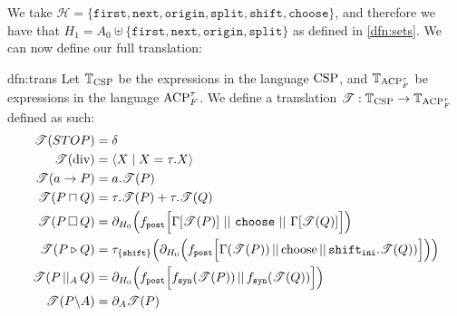 \documentclass[../hons_project.tex]{subfiles}
\begin{document}
We take $\mathscr{H} = \{\mathtt{first}, \mathtt{next}, \mathtt{origin}, \mathtt{split}, \mathtt{shift}, \mathtt{choose}\}$, and therefore we have that $H_{1} = A_{0} \uplus \{\mathtt{first}, \mathtt{next}, \mathtt{origin}, \mathtt{split}\}$ as defined in \ref{dfn:sets}. We can now define our full translation:

\begin{dfn}{dfn:trans}{}
	Let $\mathbb{T}_{\mathrm{CSP}}$ be the expressions in the language $\mathrm{CSP}$, and $\mathbb{T}_{\mathrm{ACP}_{F}^{\tau}}$ be expressions in the language $\mathrm{ACP}_{F}^{\tau}$. We define a translation $\mathscr{T} : \mathbb{T}_{\mathrm{CSP}} \to \mathbb{T}_{\mathrm{ACP}_{F}^{\tau}}$ defined as such:
	\begin{align*}
		\trans{STOP}           & = \delta                                                                                                                                                                                     \\
		\trans{\mathrm{div}}   & = \langle X \mid X = \tau.X \rangle                                                                                                                                                          \\
		\trans{a \to P}        & = a.\trans{P}                                                                                                                                                                                \\
		\trans{P \intchoice Q} & = \tau.\trans{P} + \tau.\trans{Q}                                                                                                                                                            \\
		\trans{P \extchoice Q} & = \partial_{H_{0}}\Bigl(\fdef{post}\Bigl[\Gamma[\trans{P}]\, \merge \,\mathtt{choose}\, \merge \,\Gamma[\trans{Q}]\Bigl]\Bigr)                                                               \\
		\trans{P \sliding Q}   & = \tau_{\{\mathtt{shift}\}}\Bigl(\partial_{H_{0}}\Bigl(f_{\mathtt{post}}\Bigl[ \Gamma(\trans{P}) \merge \mathrm{choose} \merge \mathtt{shift}_{\mathtt{ini}} . \trans{Q}) \Bigr]\Bigr)\Bigr) \\
		\trans{P \pcomp Q}     & = \partial_{H_{0}}\Bigl(\fdef{post}\Bigl[\fdef{syn}(\trans{P}) \merge \fdef{syn}(\trans{Q})\Bigr]\Bigr)                                                                                      \\
		\trans{P \backslash A} & = \partial_{A}{\trans{P}}                                                                                                                                                                    \\

\end{align*}
\end{dfn}
\end{document}
